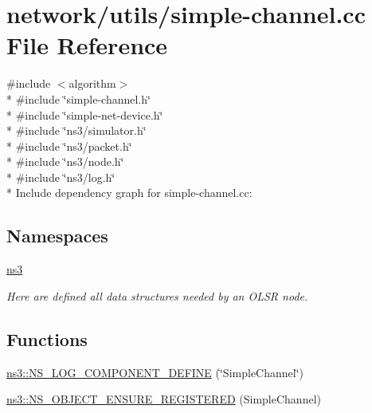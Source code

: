 \hypertarget{simple-channel_8cc}{}\section{network/utils/simple-\/channel.cc File Reference}
\label{simple-channel_8cc}
{\ttfamily \#include $<$algorithm$>$}\\*
{\ttfamily \#include \char`\"{}simple-\/channel.\+h\char`\"{}}\\*
{\ttfamily \#include \char`\"{}simple-\/net-\/device.\+h\char`\"{}}\\*
{\ttfamily \#include \char`\"{}ns3/simulator.\+h\char`\"{}}\\*
{\ttfamily \#include \char`\"{}ns3/packet.\+h\char`\"{}}\\*
{\ttfamily \#include \char`\"{}ns3/node.\+h\char`\"{}}\\*
{\ttfamily \#include \char`\"{}ns3/log.\+h\char`\"{}}\\*
Include dependency graph for simple-\/channel.cc\+:
\subsection*{Namespaces}
\begin{DoxyCompactItemize}
\item 
 \hyperlink{namespacens3}{ns3}
\begin{DoxyCompactList}\small\item\em Here are defined all data structures needed by an O\+L\+SR node. \end{DoxyCompactList}\end{DoxyCompactItemize}
\subsection*{Functions}
\begin{DoxyCompactItemize}
\item 
\hyperlink{namespacens3_ad3e43d29f60d482ebb221b8cb7fc7b2b}{ns3\+::\+N\+S\+\_\+\+L\+O\+G\+\_\+\+C\+O\+M\+P\+O\+N\+E\+N\+T\+\_\+\+D\+E\+F\+I\+NE} (\char`\"{}Simple\+Channel\char`\"{})
\item 
\hyperlink{namespacens3_a443089f285b1b9aa2e7881eb25b188c3}{ns3\+::\+N\+S\+\_\+\+O\+B\+J\+E\+C\+T\+\_\+\+E\+N\+S\+U\+R\+E\+\_\+\+R\+E\+G\+I\+S\+T\+E\+R\+ED} (Simple\+Channel)
\end{DoxyCompactItemize}

